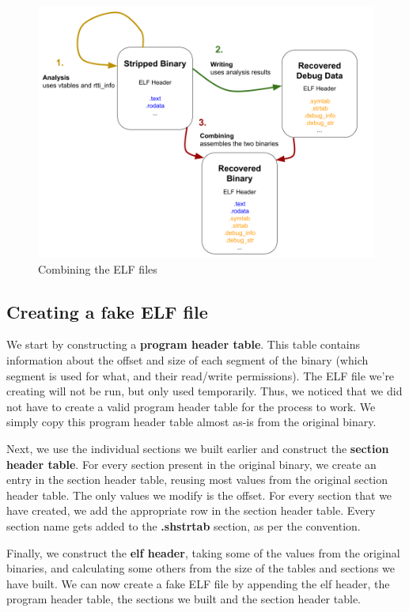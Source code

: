 \documentclass[a4paper,11pt,oneside]{report}
\begin{document}
\begin{figure}[h]

\includegraphics[width=16cm]{recover.png}
\caption{Combining the ELF files}
\label{recovergraph}

\end{figure}

\subsection{Creating a fake ELF file}

We start by constructing a \textbf{program header table}.
This table contains information about the offset and size of each segment of 
the binary (which segment is used for what, and their read/write permissions).
The ELF file we're creating will not be run, but only used temporarily.
Thus, we noticed that we did not have to create a valid program header table 
for the process to work.
We simply copy this program header table almost as-is from the original binary.

Next, we use the individual sections we built earlier and construct the 
\textbf{section header table}.
For every section present in the original binary, we create an entry in the 
section header table, reusing most values from the original section header 
table.
The only values we modify is the offset.
For every section that we have created, we add the appropriate row in the 
section header table.
Every section name gets added to the \textbf{.shstrtab} section, as per the 
convention.

Finally, we construct the \textbf{elf header}, taking some of the values from 
the original binaries, and calculating some others from the size of the tables 
and sections we have built.
We can now create a fake ELF file by appending the elf header, the program 
header table, the sections we built and the section header table.
\end{document}
